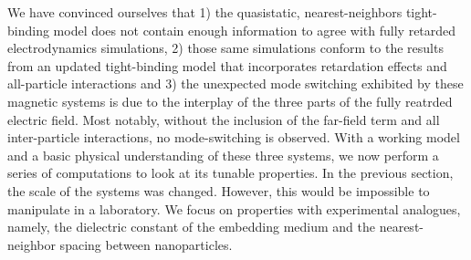 \documentclass[journal=apchd5,manuscript=article]{achemso}
\begin{document}
We have convinced ourselves that 1) the quasistatic, nearest-neighbors tight-binding model does not contain enough information to agree with fully retarded electrodynamics simulations, 2) those same simulations conform to the results from an updated tight-binding model that incorporates retardation effects and all-particle interactions and 3) the unexpected mode switching exhibited by these magnetic systems is due to the interplay of the three parts of the fully reatrded electric field. Most notably, without the inclusion of the far-field term and all inter-particle interactions, no mode-switching is observed. With a working model and a basic physical understanding of these three systems, we now perform a series of computations to look at its tunable properties. In the previous section, the scale of the systems was changed. However, this would be impossible to manipulate in a laboratory. We focus on properties with experimental analogues, namely, the dielectric constant of the embedding medium and the nearest-neighbor spacing between nanoparticles.
\end{document}
